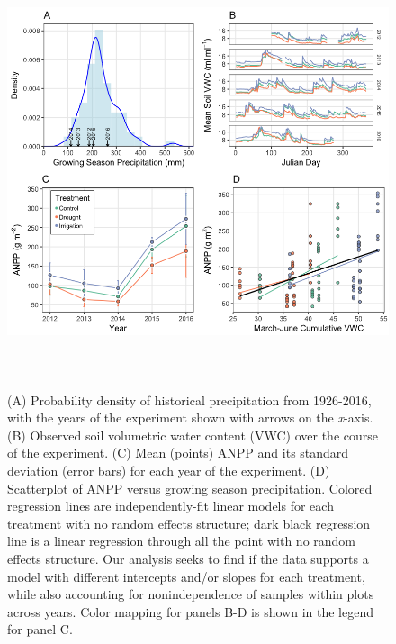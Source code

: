 \documentclass[fleqn,10pt]{wlpeerj} %
\begin{document}
\newpage{}

\begin{figure}[!ht]
  \centering
      \includegraphics[height=5in]{../figures/Figure1.png}
  \caption{(A) Probability density of historical precipitation from 1926-2016, with the years of the experiment shown with arrows on the \emph{x}-axis. (B) Observed soil volumetric water content (VWC) over the course of the experiment. (C) Mean (points) ANPP and its standard deviation (error bars) for each year of the experiment. (D) Scatterplot of ANPP versus growing season precipitation. Colored regression lines are independently-fit linear models for each treatment with no random effects structure; dark black regression line is a linear regression through all the point with no random effects structure. Our analysis seeks to find if the data supports a model with different intercepts and/or slopes for each treatment, while also accounting for nonindependence of samples within plots across years. Color mapping for panels B-D is shown in the legend for panel C.}
\end{figure}

\newpage{}
\end{document}
